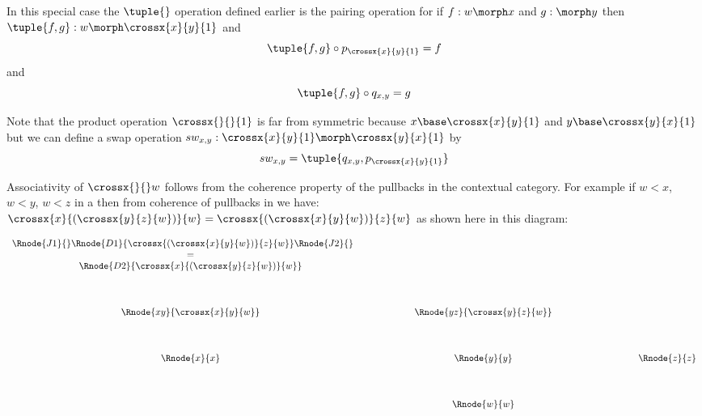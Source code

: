 In this special case the $\tuple{}$ operation defined earlier is the pairing operation for if
$f: w \morph x$ and $g: \morph y$ then $\tuple{f,g}: w \morph \crossx{x}{y}{1}$ 
and 
\begin{equation}
\tuple{f,g} \circ p_{\crossx{x}{y}{1}} = f
\end{equation}
and
\begin{equation}
\tuple{f,g} \circ q_{x,y} = g
\end{equation}


\note 
Note that the product operation $\crossx{}{}{1}$ is far from symmetric 
because $x \base \crossx{x}{y}{1}$ and $y \base \crossx{y}{x}{1}$ but we can define 
a swap operation $sw_{x,y} : \crossx{x}{y}{1} \morph \crossx{y}{x}{1}$ by
\begin{equation}
sw_{x,y} = \tuple{q_{x,y}, p_{\crossx{x}{y}{1}}}
\end{equation}

\note
Associativity of $\crossx{}{}w$  follows from the coherence property of the pullbacks in the contextual category. 
For example if $w < x$, $w < y$, $w < z$ in a \ccat then from coherence of pullbacks in \ccat we have:
$\crossx{x}{(\crossx{y}{z}{w})}{w} = \crossx{(\crossx{x}{y}{w})}{z}{w}$ as shown here in this diagram:
 
\begin{displaymath}
\begin{array}{cp{1.0cm}cp{1.0cm}c}
\Rnode{J1}{}\Rnode{D1} {\crossx{(\crossx{x}{y}{w})}{z}{w}}\Rnode{J2}{} \ \ \ \ \   &&  &&  \\ 
= && && \\
\Rnode{D2} {\crossx{x}{(\crossx{y}{z}{w})}{w}}    &&  &&                        \\ [1.3cm]
\Rnode{xy}{\crossx{x}{y}{w}}&& \Rnode{yz}{\crossx{y}{z}{w}} &&                      \\[1.3cm]
\Rnode{x}{x}&& \Rnode{y}{y} && \ \ \ \ \ \ \ \ \ \ \ \ \ \Rnode{z}{z}                                        \\[1.3cm]
             && \Rnode{w}{w} &&                                                     
\end{array}
\end{displaymath}









